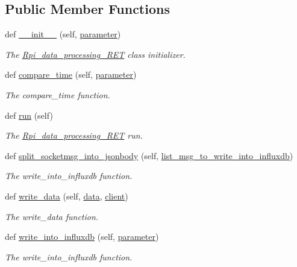 \subsection*{Public Member Functions}
\begin{DoxyCompactItemize}
\item 
def \hyperlink{a00033_a297f3b1ee42e9ff40c0ec84bb5996ea5}{\+\_\+\+\_\+init\+\_\+\+\_\+} (self, \hyperlink{a00033_a0d71b5c1dcca8d3fee88d6a11d3e2071}{parameter})
\begin{DoxyCompactList}\small\item\em The \hyperlink{a00033}{Rpi\+\_\+data\+\_\+processing\+\_\+\+R\+ET} class initializer. \end{DoxyCompactList}\item 
def \hyperlink{a00033_aabf1e0147a0b90298390d1d290899798}{compare\+\_\+time} (self, \hyperlink{a00033_a0d71b5c1dcca8d3fee88d6a11d3e2071}{parameter})
\begin{DoxyCompactList}\small\item\em The compare\+\_\+time function. \end{DoxyCompactList}\item 
def \hyperlink{a00033_ad22709b2e67308af35f55680d5a026e0}{run} (self)
\begin{DoxyCompactList}\small\item\em The \hyperlink{a00033}{Rpi\+\_\+data\+\_\+processing\+\_\+\+R\+ET} run. \end{DoxyCompactList}\item 
def \hyperlink{a00033_a71f5fdb2257f4091ac30e52dd721ba5d}{split\+\_\+socketmsg\+\_\+into\+\_\+jsonbody} (self, \hyperlink{a00033_a34618055fe0360ecf68a0ca2d02d49d7}{list\+\_\+msg\+\_\+to\+\_\+write\+\_\+into\+\_\+influxdb})
\begin{DoxyCompactList}\small\item\em The write\+\_\+into\+\_\+influxdb function. \end{DoxyCompactList}\item 
def \hyperlink{a00033_aeac53798a2492d9c668ee8f6d6ed27a7}{write\+\_\+data} (self, \hyperlink{a00033_a511ae0b1c13f95e5f08f1a0dd3da3d93}{data}, \hyperlink{a00033_ad5bc32b75da65fe60067f501a4bb6665}{client})
\begin{DoxyCompactList}\small\item\em The write\+\_\+data function. \end{DoxyCompactList}\item 
def \hyperlink{a00033_a101b529fa7a9b949c062e55c5e52f781}{write\+\_\+into\+\_\+influxdb} (self, \hyperlink{a00033_a0d71b5c1dcca8d3fee88d6a11d3e2071}{parameter})
\begin{DoxyCompactList}\small\item\em The write\+\_\+into\+\_\+influxdb function. \end{DoxyCompactList}\end{DoxyCompactItemize}
